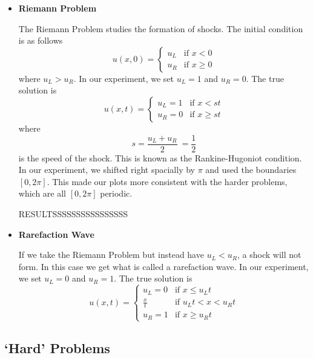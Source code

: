 \documentclass{myproject}
\begin{document}
\begin{itemize}
	\item \textbf{Riemann Problem}
	
	The Riemann Problem studies the formation of shocks. The initial condition is as follows
	\begin{equation}
		u(x,0) = 
	    \begin{cases}
	      	u_L & \text{if } x < 0 \\
			u_R & \text{if } x \geq 0
	    \end{cases}
	\end{equation}
	where $u_L > u_R$. In our experiment, we set $u_L = 1$ and $u_R = 0$. The true solution is
	\begin{equation}
		u(x,t) = 
	    \begin{cases}
	      	u_L = 1 & \text{if } x < st \\
			u_R = 0 & \text{if } x \geq st
	    \end{cases}
	\end{equation}
	where \[s = \frac{u_L + u_R}{2}\ = \frac{1}{2}\] is the speed of the shock. This is known as the Rankine-Hugoniot condition. In our experiment, we shifted right spacially by $\pi$ and used the boundaries $[0, 2\pi]$. This made our plots more consistent with the harder problems, which are all $[0, 2\pi]$ periodic.
	
	RESULTSSSSSSSSSSSSSSSS
	
	\item \textbf{Rarefaction Wave}
	
	If we take the Riemann Problem but instead have $u_L < u_R$, a shock will not form. In this case we get what is called a rarefaction wave. In our experiment, we set $u_L = 0$ and $u_R = 1$. The true solution is
	\begin{equation}
		u(x,t) = 
	    \begin{cases}
	      	u_L = 0 & \text{if } x \leq {u_L}t \\
			\frac{x}{t} & \text{if } {u_L}t < x < {u_R}t \\
			u_R = 1 & \text{if } x \geq {u_R}t
	    \end{cases}
	\end{equation}
	
\end{itemize}

\subsection{`Hard' Problems}
\end{document}
